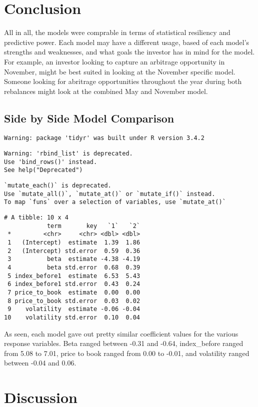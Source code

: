 \documentclass[12pt,twoside]{reedthesis}
\theoremstyle{definition}
\theoremstyle{definition}
\theoremstyle{definition}
\theoremstyle{remark}
\begin{document}
\chapter{Conclusion}\label{conclusion}

All in all, the models were comprable in terms of statistical resiliency
and predictive power. Each model may have a different usage, based of
each model's strengths and weaknesses, and what goals the investor has
in mind for the model. For example, an investor looking to capture an
arbitrage opportunity in November, might be best suited in looking at
the November specific model. Someone looking for abritrage opportunities
throughout the year during both rebalances might look at the combined
May and November model.

\section{Side by Side Model
Comparison}\label{side-by-side-model-comparison}
\begin{verbatim}
Warning: package 'tidyr' was built under R version 3.4.2
\end{verbatim}
\begin{verbatim}
Warning: 'rbind_list' is deprecated.
Use 'bind_rows()' instead.
See help("Deprecated")
\end{verbatim}
\begin{verbatim}
`mutate_each()` is deprecated.
Use `mutate_all()`, `mutate_at()` or `mutate_if()` instead.
To map `funs` over a selection of variables, use `mutate_at()`
\end{verbatim}
\begin{verbatim}
# A tibble: 10 x 4
            term       key   `1`   `2`
 *         <chr>     <chr> <dbl> <dbl>
 1   (Intercept)  estimate  1.39  1.86
 2   (Intercept) std.error  0.59  0.36
 3          beta  estimate -4.38 -4.19
 4          beta std.error  0.68  0.39
 5 index_before1  estimate  6.53  5.43
 6 index_before1 std.error  0.43  0.24
 7 price_to_book  estimate  0.00  0.00
 8 price_to_book std.error  0.03  0.02
 9    volatility  estimate -0.06 -0.04
10    volatility std.error  0.10  0.04
\end{verbatim}
As seen, each model gave out pretty similar coefficient values for the
various response variables. Beta ranged between -0.31 and -0.64,
index\_before ranged from 5.08 to 7.01, price to book ranged from 0.00
to -0.01, and volatility ranged between -0.04 and 0.06.

\chapter{Discussion}\label{discussion}
\end{document}
